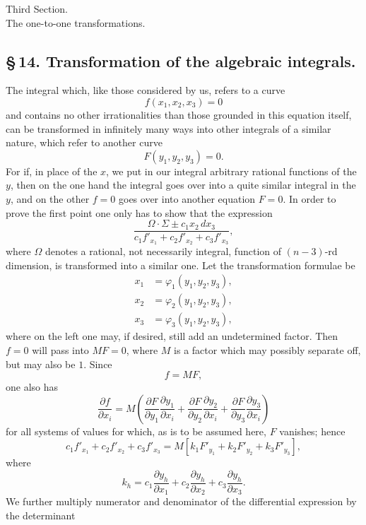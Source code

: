 \documentclass[10pt]{article}
\begin{document}

\begin{center}
{\large Third Section.}\\[0.35em]
{\Large The one-to-one transformations.}
\end{center}

\subsection*{\S\,14. Transformation of the algebraic integrals.}

The integral which, like those considered by us, refers to a curve
\[
f(x_1,x_2,x_3)=0
\]
and contains no other irrationalities than those grounded in this equation itself, can be transformed in infinitely many ways into other integrals of a similar nature, which refer to another curve
\[
F(y_1,y_2,y_3)=0.
\]
For if, in place of the \(x\), we put in our integral arbitrary rational functions of the \(y\), then on the one hand the integral goes over into a quite similar integral in the \(y\), and on the other \(f=0\) goes over into another equation \(F=0\). In order to prove the first point one only has to show that the expression
\[
\frac{\Omega\cdot \Sigma\pm c_1x_2\,dx_3}
 {c_1f'_{x_1}+c_2f'_{x_2}+c_3f'_{x_3}},
\]
where \(\Omega\) denotes a rational, not necessarily integral, function of \((n-3)\)-rd dimension, is transformed into a similar one. Let the transformation formulae be
\[
\tag{1}
\begin{aligned}
x_1&=\varphi_1(y_1,y_2,y_3),\\
x_2&=\varphi_2(y_1,y_2,y_3),\\
x_3&=\varphi_3(y_1,y_2,y_3),
\end{aligned}
\]
where on the left one may, if desired, still add an undetermined factor. Then \(f=0\) will pass into \(MF=0\), where \(M\) is a factor which may possibly separate off, but may also be \(1\). Since
\[
f=MF,
\]
one also has
\[
\frac{\partial f}{\partial x_i}
=M\left(
\frac{\partial F}{\partial y_1}\frac{\partial y_1}{\partial x_i}
+\frac{\partial F}{\partial y_2}\frac{\partial y_2}{\partial x_i}
+\frac{\partial F}{\partial y_3}\frac{\partial y_3}{\partial x_i}
\right)
\]
for all systems of values for which, as is to be assumed here, \(F\) vanishes; hence
\[
c_1f'_{x_1}+c_2f'_{x_2}+c_3f'_{x_3}
=M\left[k_1F'_{y_1}+k_2F'_{y_2}+k_3F'_{y_3}\right],
\]
where
\[
k_h=c_1\frac{\partial y_h}{\partial x_1}
+c_2\frac{\partial y_h}{\partial x_2}
+c_3\frac{\partial y_h}{\partial x_3}.
\]
We further multiply numerator and denominator of the differential expression by the determinant
\end{document}
